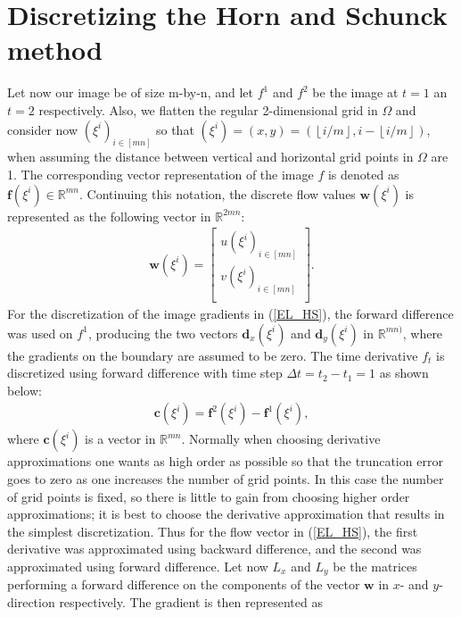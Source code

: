 \section{Discretizing the Horn and Schunck method}
\label{sec: disc}
Let now our image be of size m-by-n, and let $f^1$ and $f^2$ be the image at $t=1$ an $t=2$ respectively. Also, we flatten the regular 2-dimensional grid in $\Omega$ and consider now $(\xi^i)_ {i \in [mn]}$ so that $(\xi^i) = (x,y) = (\left \lfloor{i/m}\right \rfloor, i - \left \lfloor{i/m}\right \rfloor)$, when assuming the distance between vertical and horizontal grid points in $\Omega$ are 1. The corresponding vector representation of the image $f$ is denoted as $\textbf{f}(\xi^i) \in \mathbb{R}^{mn}$. Continuing this notation, the discrete flow values $\textbf{w}(\xi^i)$ is represented as the following vector in $\mathbb{R}^{2mn}$:
\begin{align*}
     \textbf{w}(\xi^i)=\begin{bmatrix}
         u(\xi^i)_{i\in [mn]}  \\
         v(\xi^i)_{i \in [mn]} \\
        \end{bmatrix}.
\end{align*}
For the discretization of the image gradients in (\ref{EL_HS}), the forward difference was used on $f^1$, producing the two vectors $\textbf{d}_x(\xi^i)$ and $\textbf{d}_y(\xi^i)$ in $\mathbb{R}^{mn)}$, where the gradients on the boundary are assumed to be zero. The time derivative $f_t$ is discretized using forward difference with time step $\Delta t = t_2 - t_1 = 1$ as shown below:
\begin{align*}
\textbf{c}(\xi^i) = \textbf{f}^2(\xi^i) - \textbf{f}^1(\xi^i),
\end{align*} 
where $\textbf{c}(\xi^i)$ is a vector in $\mathbb{R}^{mn}$. Normally when choosing derivative approximations one wants as high order as possible so that the truncation error goes to zero as one increases the number of grid points. In this case the number of grid points is fixed, so there is little to gain from choosing higher order approximations; it is best to choose the derivative approximation that results in the simplest discretization. Thus for the flow vector in (\ref{EL_HS}), the first derivative was approximated using backward difference, and the second was approximated using forward difference. Let now $L_x$ and $L_y$ be the matrices performing a forward difference on the components of the vector $\textbf{w}$ in $x$- and $y$-direction respectively. The gradient is then represented as

